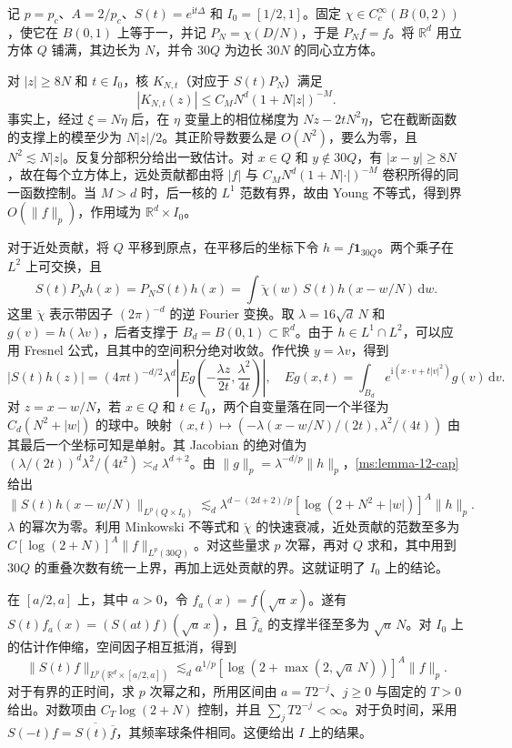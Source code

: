 记 $p=p_c$、$A=2/p_c$、$S(t)=e^{\mathrm it\Delta}$ 和 $I_0=[1/2,1]$。固定 $\chi\in C_c^\infty(B(0,2))$，使它在 $B(0,1)$ 上等于一，并记 $P_N=\chi(D/N)$，于是 $P_Nf=f$。将 $\mathbb R^d$ 用立方体 $Q$ 铺满，其边长为 $N$，并令 $30Q$ 为边长 $30N$ 的同心立方体。

对 $|z|\geq8N$ 和 $t\in I_0$，核 $K_{N,t}$（对应于 $S(t)P_N$）满足
\[
|K_{N,t}(z)|\leq C_M N^d(1+N|z|)^{-M}.
\]
事实上，经过 $\xi=N\eta$ 后，在 $\eta$ 变量上的相位梯度为 $Nz-2tN^2\eta$，它在截断函数的支撑上的模至少为 $N|z|/2$。其正阶导数要么是 $O(N^2)$，要么为零，且 $N^2\lesssim N|z|$。反复分部积分给出一致估计。对 $x\in Q$ 和 $y\notin30Q$，有 $|x-y|\geq8N$，故在每个立方体上，远处贡献都由将 $|f|$ 与 $C_M N^d(1+N|\cdot|)^{-M}$ 卷积所得的同一函数控制。当 $M>d$ 时，后一核的 $L^1$ 范数有界，故由 Young 不等式，得到界 $O(\|f\|_p)$，作用域为 $\mathbb R^d\times I_0$。

对于近处贡献，将 $Q$ 平移到原点，在平移后的坐标下令 $h=f\mathbf 1_{30Q}$。两个乘子在 $L^2$ 上可交换，且
\[
S(t)P_Nh(x)=P_NS(t)h(x)
 =\int\check\chi(w)\,S(t)h(x-w/N)\,\mathrm dw.
\]
这里 $\check\chi$ 表示带因子 $(2\pi)^{-d}$ 的逆 Fourier 变换。取 $\lambda=16\sqrt d\,N$ 和 $g(v)=h(\lambda v)$，后者支撑于 $B_d=B(0,1)\subset\mathbb R^d$。由于 $h\in L^1\cap L^2$，可以应用 Fresnel 公式，且其中的空间积分绝对收敛。作代换 $y=\lambda v$，得到
\[
|S(t)h(z)|=(4\pi t)^{-d/2}\lambda^d
 \left|Eg\!\left(-\frac{\lambda z}{2t},\frac{\lambda^2}{4t}\right)\right|,
\quad
Eg(x,t)=\int_{B_d}e^{\mathrm i(x\cdot v+t|v|^2)}g(v)\,\mathrm dv.
\]
对 $z=x-w/N$，若 $x\in Q$ 和 $t\in I_0$，两个自变量落在同一个半径为 $C_d(N^2+|w|)$ 的球中。映射 $(x,t)\mapsto(-\lambda(x-w/N)/(2t),\lambda^2/(4t))$ 由其最后一个坐标可知是单射。其 Jacobian 的绝对值为 $(\lambda/(2t))^d\lambda^2/(4t^2)\asymp_d\lambda^{d+2}$。由 $\|g\|_p=\lambda^{-d/p}\|h\|_p$，\ref{ms:lemma-12-cap} 给出
\[
\|S(t)h(x-w/N)\|_{L^p(Q\times I_0)}
 \lesssim_d \lambda^{d-(2d+2)/p}[\log(2+N^2+|w|)]^A\|h\|_p.
\]
$\lambda$ 的幂次为零。利用 Minkowski 不等式和 $\check\chi$ 的快速衰减，近处贡献的范数至多为 $C[\log(2+N)]^A\|f\|_{L^p(30Q)}$。对这些量求 $p$ 次幂，再对 $Q$ 求和，其中用到 $30Q$ 的重叠次数有统一上界，再加上远处贡献的界。这就证明了 $I_0$ 上的结论。

在 $[a/2,a]$ 上，其中 $a>0$，令 $f_a(x)=f(\sqrt a\,x)$。遂有 $S(t)f_a(x)=(S(at)f)(\sqrt a\,x)$，且 $\widehat f_a$ 的支撑半径至多为 $\sqrt a\,N$。对 $I_0$ 上的估计作伸缩，空间因子相互抵消，得到
\[
\|S(t)f\|_{L^p(\mathbb R^d\times[a/2,a])}
 \lesssim_d a^{1/p}[\log(2+\max(2,\sqrt a\,N))]^A\|f\|_p.
\]
对于有界的正时间，求 $p$ 次幂之和，所用区间由 $a=T2^{-j}$、$j\geq0$ 与固定的 $T>0$ 给出。对数项由 $C_T\log(2+N)$ 控制，并且 $\sum_j T2^{-j}<\infty$。对于负时间，采用 $S(-t)f=\overline{S(t)\overline f}$，其频率球条件相同。这便给出 $I$ 上的结果。
